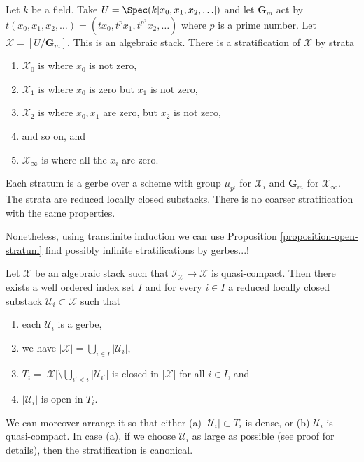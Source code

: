 \begin{example}
\label{example-infinite-stratification}
Let $k$ be a field.
Take $U = \Spec(k[x_0, x_1, x_2, \ldots])$
and let $\mathbf{G}_m$ act by
$t(x_0, x_1, x_2, \ldots) = (tx_0, t^p x_1, t^{p^2} x_2, \ldots)$
where $p$ is a prime number. Let $\mathcal{X} = [U/\mathbf{G}_m]$.
This is an algebraic stack. There is a stratification of $\mathcal{X}$
by strata
\begin{enumerate}
\item $\mathcal{X}_0$ is where $x_0$ is not zero,
\item $\mathcal{X}_1$ is where $x_0$ is zero but $x_1$ is not zero,
\item $\mathcal{X}_2$ is where $x_0, x_1$ are zero, but $x_2$ is not zero,
\item and so on, and
\item $\mathcal{X}_{\infty}$ is where all the $x_i$ are zero.
\end{enumerate}
Each stratum is a gerbe over a scheme with group $\mu_{p^i}$ for
$\mathcal{X}_i$ and $\mathbf{G}_m$ for $\mathcal{X}_{\infty}$.
The strata are reduced locally closed substacks. There is no coarser
stratification with the same properties.
\end{example}

\noindent
Nonetheless, using transfinite induction we can use
Proposition \ref{proposition-open-stratum}
find possibly infinite stratifications by gerbes...!

\begin{lemma}
\label{lemma-every-point-in-a-stratum}
Let $\mathcal{X}$ be an algebraic stack such that
$\mathcal{I}_\mathcal{X} \to \mathcal{X}$ is quasi-compact.
Then there exists a well ordered index set $I$ and for every $i \in I$
a reduced locally closed substack $\mathcal{U}_i \subset \mathcal{X}$ such that
\begin{enumerate}
\item each $\mathcal{U}_i$ is a gerbe,
\item we have $|\mathcal{X}| = \bigcup_{i \in I} |\mathcal{U}_i|$,
\item $T_i = |\mathcal{X}| \setminus \bigcup_{i' < i} |\mathcal{U}_{i'}|$
is closed in $|\mathcal{X}|$ for all $i \in I$, and
\item $|\mathcal{U}_i|$ is open in $T_i$.
\end{enumerate}
We can moreover arrange it so that either (a) $|\mathcal{U}_i| \subset T_i$
is dense, or (b) $\mathcal{U}_i$ is quasi-compact. In case (a), if
we choose $\mathcal{U}_i$ as large as possible (see proof for details), then
the stratification is canonical.
\end{lemma}

